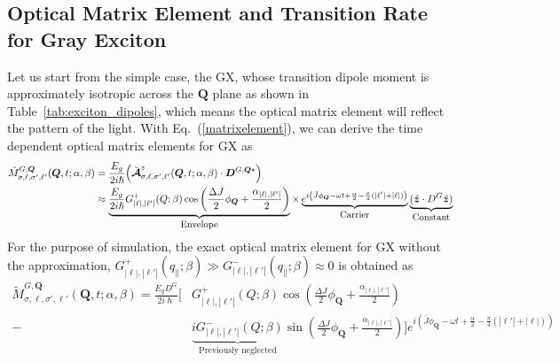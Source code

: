 \subsection{Optical Matrix Element and Transition Rate for Gray Exciton}
Let us start from the simple case, the GX, whose transition dipole moment is approximately isotropic across the $\boldsymbol{Q}$ plane as shown in Table~\ref{tab:exciton_dipoles}, which means the optical matrix element will reflect the pattern of the light. With Eq.~(\ref{matrixelement}), we can derive the time dependent optical matrix elements for GX as
\begin{equation}
\begin{aligned}[b]
\tilde{M}_{\sigma,\ell,\sigma',\ell'}^{G,\boldsymbol{Q}}(\boldsymbol{Q}, t; \alpha, \beta) 
&= \frac{E_g}{2i\hslash} \Big( \tilde{\boldsymbol{\mathcal{A}}}_{\sigma,\ell,\sigma',\ell'}^z(\boldsymbol{Q}, t; \alpha, \beta) \cdot \boldsymbol{D}^{G,\boldsymbol{Q}*} \Big) \\
&\approx \underbrace{\frac{E_g}{2i\hslash} G_{|\ell|,|\ell'|}^{+}(Q; \beta) \cos \left( \frac{\Delta J}{2} \phi_{\boldsymbol{Q}} + \frac{\alpha_{|\ell|,|\ell'|}}{2} \right)}_{\text{\small Envelope}} 
\times \underbrace{e^{i \left( \bar{J} \phi_{\boldsymbol{Q}} - \omega t + \frac{\alpha}{2} - \frac{\pi}{4} (|\ell'| + |\ell|) \right)}}_{\text{\small Carrier}} 
\underbrace{(\hat{\boldsymbol{z}} \cdot D^G \hat{\boldsymbol{z}})}_{\text{\small Constant}}
\end{aligned}
\label{eq:matrixelement_GX}
\end{equation}
\noindent
For the purpose of simulation, the exact optical matrix element for GX without the approximation, $G_{\left|\ell\right|,\left|\ell'\right|}^{+}(q_{\parallel}; \beta) \gg G_{\left|\ell\right|,\left|\ell'\right|}^{-}(q_{\parallel}; \beta)\approx0$ is obtained as
\begin{equation}
\begin{aligned}
\tilde{M}_{\sigma,\ell,\sigma',\ell'}^{G,\boldsymbol{Q}}(\boldsymbol{Q}, t; \alpha, \beta) 
= \frac{E_g D^G}{2i\hslash} \Bigg[& G_{|\ell|,|\ell'|}^+(Q; \beta) \cos \left( \frac{\Delta J}{2} \phi_{\boldsymbol{Q}} + \frac{\alpha_{|\ell|,|\ell'|}}{2} \right) \\
 - &\underbrace{iG_{|\ell|,|\ell'|}^-(Q; \beta)}_{\text{Previously neglected}} \sin \left( \frac{\Delta J}{2} \phi_{\boldsymbol{Q}} + \frac{\alpha_{|\ell|,|\ell'|}}{2} \right) \Bigg] e^{i \left( \bar{J} \phi_{\boldsymbol{Q}} - \omega t + \frac{\alpha}{2} - \frac{\pi}{4} (|\ell'| + |\ell|) \right)}
\end{aligned}
\label{eq:matrixelement_exact_GX}
\end{equation}

